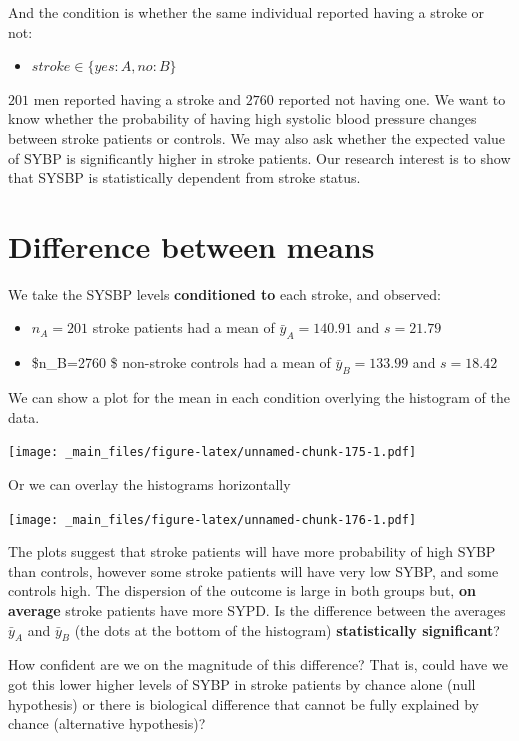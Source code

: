\documentclass[
]{book}
\providecommand{\tightlist}{%
  \setlength{\itemsep}{0pt}\setlength{\parskip}{0pt}}
\begin{document}
And the condition is whether the same individual reported having a stroke or not:

\begin{itemize}
\tightlist
\item
  \(stroke \in \{yes:A,no:B\}\)
\end{itemize}

\(201\) men reported having a stroke and \(2760\) reported not having one. We want to know whether the probability of having high systolic blood pressure changes between stroke patients or controls. We may also ask whether the expected value of SYBP is significantly higher in stroke patients. Our research interest is to show that SYSBP is statistically dependent from stroke status.

\hypertarget{difference-between-means}{%
\section{Difference between means}\label{difference-between-means}}

We take the SYSBP levels \textbf{conditioned to} each stroke, and observed:

\begin{itemize}
\item
  \(n_A=201\) stroke patients had a mean of \(\bar{y}_A=140.91\) and \(s=21.79\)
\item
  \$n\_B=2760 \$ non-stroke controls had a mean of \(\bar{y}_B=133.99\) and \(s=18.42\)
\end{itemize}

We can show a plot for the mean in each condition overlying the histogram of the data.

\texttt{[image: \_main\_files/figure-latex/unnamed-chunk-175-1.pdf]}

Or we can overlay the histograms horizontally

\texttt{[image: \_main\_files/figure-latex/unnamed-chunk-176-1.pdf]}

The plots suggest that stroke patients will have more probability of high SYBP than controls, however some stroke patients will have very low SYBP, and some controls high. The dispersion of the outcome is large in both groups but, \textbf{on average} stroke patients have more SYPD. Is the difference between the averages \(\bar{y}_A\) and \(\bar{y}_B\) (the dots at the bottom of the histogram) \textbf{statistically significant}?

How confident are we on the magnitude of this difference? That is, could have we got this lower higher levels of SYBP in stroke patients by chance alone (null hypothesis) or there is biological difference that cannot be fully explained by chance (alternative hypothesis)?
\end{document}
